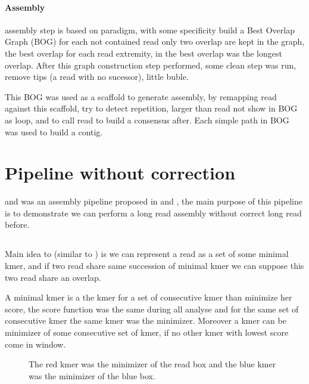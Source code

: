\documentclass[main]{subfiles}
\begin{document}
\paragraph{Assembly}

\canu assembly step is based on \OLC paradigm, with some specificity \canu build a Best Overlap Graph (BOG) for each not contained read only two overlap are kept in the graph, the best overlap for each read extremity, in \canu the best overlap was the longest overlap. After this graph construction step performed, some clean step was run, remove tips (a read with no sucessor), little buble.

This BOG was used as a scaffold to generate assembly, by remapping read against this scaffold, \canu try to detect repetition, larger than read not show in BOG as loop, and to call read to build a consensus after. Each simple path in BOG was used to build a contig. 


\section{Pipeline without correction \miniasm} \label{section:sota:miniasm}

\minimap and \miniasm was an assembly pipeline proposed in \cite{miniasm_minimap} and \cite{minimap2}, the main purpose of this pipeline is to demonstrate we can perform a long read assembly without correct long read before.

\subsection{\minimap}

Main idea to \minimap (similar to \mhap) is we can represent a read as a set of some minimal kmer, and if two read share same succession of minimal kmer we can suppose this two read share an overlap.

A minimal kmer is a the kmer for a set of consecutive kmer than minimize her score, the score function was the same during all analyse and for the same set of consecutive kmer the same kmer was the minimizer. Moreover a kmer can be minimizer of some consecutive set of kmer, if no other kmer with lowest score come in window. 

\begin{figure}[ht]
    \centering
    
    \caption{The red kmer was the minimizer of the read box and the blue kmer was the minimizer of the blue box.}
    \label{sota:fig:miniasm:minimizer}
\end{figure}
\end{document}
